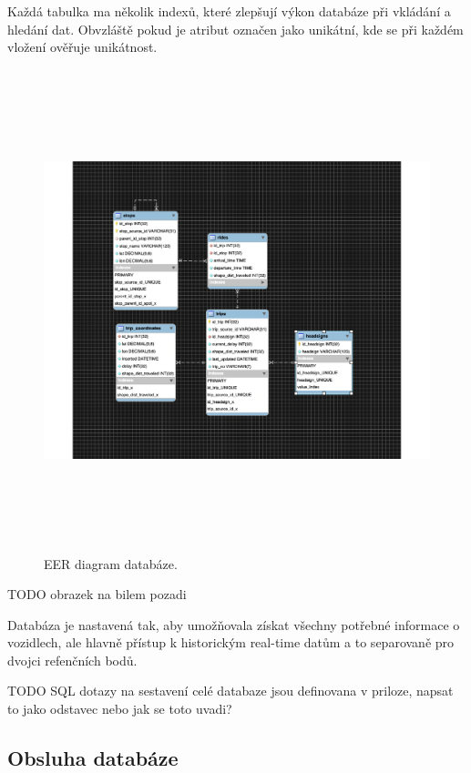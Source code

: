 \bigbreak

Každá tabulka ma několik indexů, které zlepšují výkon databáze při vkládání a hledání dat. Obvzláště pokud je atribut označen jako unikátní, kde se při každém vložení ověřuje unikátnost.

\begin{figure}[p]\centering
\includegraphics[width=140mm, height=140mm]{../img/eer_database}
\caption{EER diagram databáze.}
\label{obr01:EER}

\end{figure}

TODO obrazek na bilem pozadi

Databáza je nastavená tak, aby umožňovala získat všechny potřebné informace o vozidlech, ale hlavně přístup k historickým real-time datům a to separovaně pro dvojci refenčních bodů.

TODO SQL dotazy na sestavení celé databaze jsou definovana v priloze, napsat to jako odstavec nebo jak se toto uvadi?

\subsection{Obsluha databáze}

